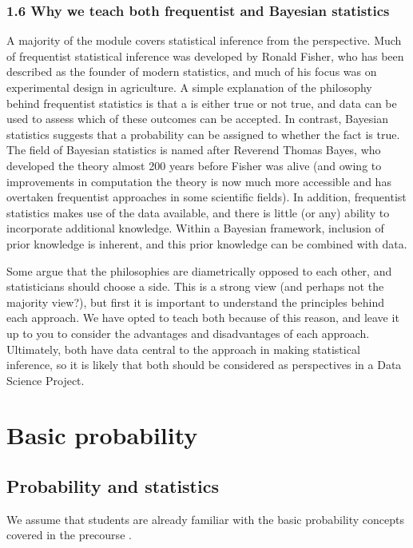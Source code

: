\documentclass[letterpaper,10pt,english]{jupyterBook}
\begin{document}
\section{1.6 Why we teach both frequentist and Bayesian statistics}
\label{\detokenize{01. Introduction:why-we-teach-both-frequentist-and-bayesian-statistics}}
\sphinxAtStartPar
A majority of the module covers statistical inference from the  perspective. Much of frequentist statistical inference was developed by Ronald Fisher, who has been described as the founder of modern statistics, and much of his focus was on experimental design in agriculture. A simple explanation of the philosophy behind frequentist statistics is that a  is either true or not true, and data can be used to assess which of these outcomes can be accepted. In contrast, Bayesian statistics suggests that a probability can be assigned to whether the fact is true. The field of Bayesian statistics is named after Reverend Thomas Bayes, who developed the theory almost 200 years before Fisher was alive (and owing to improvements in computation the theory is now much more accessible and has overtaken frequentist approaches in some scientific fields). In addition, frequentist statistics makes use of the data available, and there is little (or any) ability to incorporate additional knowledge. Within a Bayesian framework, inclusion of prior knowledge is inherent, and this prior knowledge can be combined with data.

\sphinxAtStartPar
Some argue that the philosophies are diametrically opposed to each other, and statisticians should choose a side. This is a strong view (and perhaps not the majority view?), but first it is important to understand the principles behind each approach. We have opted to teach both because of this reason, and leave it up to you to consider the advantages and disadvantages of each approach. Ultimately, both have data central to the approach in making statistical inference, so it is likely that both should be considered as perspectives in a Data Science Project.


\part{Basic probability}


\chapter{Probability and statistics}
\label{\detokenize{02. Probability.Intro:probability-and-statistics}}\label{\detokenize{02. Probability.Intro::doc}}
\sphinxAtStartPar
We assume that students are already familiar with the basic probability concepts covered in the pre\sphinxhyphen{}course .
\end{document}
